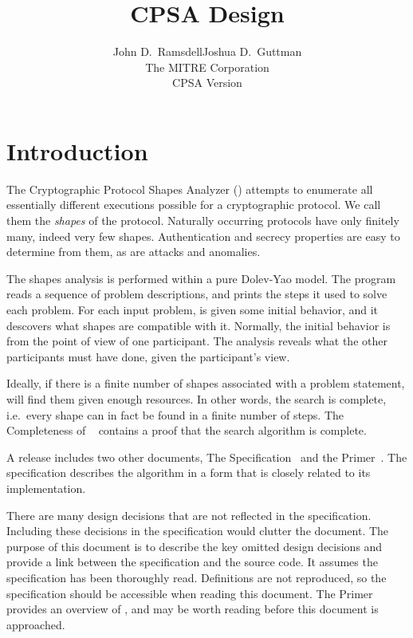 \documentclass[12pt]{report}
\title{CPSA Design}
\author{John D.~Ramsdell\qquad Joshua D.~Guttman\\
  The MITRE Corporation\\ CPSA Version \version}
\theoremstyle{definition}
\begin{document}
\maketitle
\cpsacopying

\tableofcontents

\chapter{Introduction}

The Cryptographic Protocol Shapes Analyzer ({\cpsa}) attempts to
enumerate all essentially different executions possible for a
cryptographic protocol.  We call them the \emph{shapes} of the
protocol.  Naturally occurring protocols have only finitely many,
indeed very few shapes.  Authentication and secrecy properties are
easy to determine from them, as are attacks and anomalies.

The shapes analysis is performed within a pure Dolev-Yao model.  The
{\cpsa} program reads a sequence of problem descriptions, and prints
the steps it used to solve each problem.  For each input problem,
{\cpsa} is given some initial behavior, and it descovers what shapes
are compatible with it.  Normally, the initial behavior is from the
point of view of one participant.  The analysis reveals what the other
participants must have done, given the participant's view.

Ideally, if there is a finite number of shapes associated with a
problem statement, {\cpsa} will find them given enough resources.  In
other words, the search is complete, i.e.\ every shape can in fact be
found in a finite number of steps.  The Completeness of
{\cpsa}~\cite{cpsatheory11} contains a proof that the search algorithm
is complete.

A {\cpsa} release includes two other documents, The {\cpsa}
Specification~\cite{cpsaspec09} and the {\cpsa}
Primer~\cite{cpsaprimer09}.  The specification describes the {\cpsa}
algorithm in a form that is closely related to its implementation.

There are many design decisions that are not reflected in the
specification.  Including these decisions in the specification would
clutter the document.  The purpose of this document is to describe the
key omitted design decisions and provide a link between the
specification and the source code.  It assumes the specification has
been thoroughly read.  Definitions are not reproduced, so the
specification should be accessible when reading this document.  The
{\cpsa} Primer provides an overview of {\cpsa}, and may be worth
reading before this document is approached.
\end{document}
